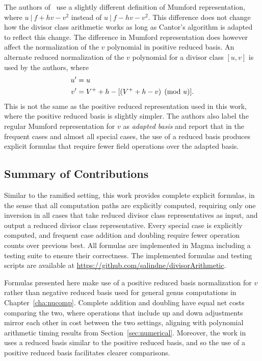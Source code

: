 The authors of~\cite{EricksonJacobsonStein_realg2_2011} use a slightly different
definition of Mumford representation, where $u ~|~ f + hv - v^2$ instead of $u
~|~ f - hv - v^2$. This difference does not change how the divisor class
arithmetic works as long as Cantor's algorithm is adapted to reflect this
change. The difference in Mumford representation does however affect the
normalization of the $v$ polynomial in positive reduced basis. An alternate reduced
normalization of the $v$ polynomial for a divisor class $[u,v]$ is used by the
authors, where 
\begin{align}
  u' & =  u \nonumber\\
  v' & =  V^{+} + h - [(V^{+} + h - v) \pmod{u}]. \label{eqn:reducedbasis}
\end{align}
This is not the same as the positive reduced representation used in this work,
where the positive reduced basis is slightly simpler. The authors also label the
regular Mumford representation for $v$ as \emph{adapted basis} and report that
in the frequent cases and almost all special cases, the use of a reduced basis
produces explicit formulas that require fewer field operations over the adapted
basis.

 
\subsection{Summary of Contributions}
Similar to the ramified setting, this work provides complete explicit formulas,
in the sense that all computation paths are explicitly computed, requiring only
one inversion in all cases that take reduced divisor class representatives as
input, and output a reduced divisor class representative. Every special case is
explicitly computed, and frequent case addition and doubling require fewer
operation counts over previous best. 
All formulas are implemented in Magma
including a testing suite to ensure their correctness. The implemented formulas
and testing scripts are available at
\url{https://github.com/salindne/divisorArithmetic}.
 

Formulas presented here make use of a positive reduced basis normalization for
$v$ rather than negative reduced basis used for general genus computations in
Chapter~\ref{cha:nucomp}. Complete addition and doubling have equal net
costs comparing the two, where operations that include up and down adjustments
mirror each other in cost between the two settings, aligning with polynomial
arithmetic timing results from Section~\ref{sec:numerical}. Moreover, the work
in~\cite{EricksonJacobsonStein_realg2_2011} uses a reduced basis similar to the
positive reduced basis, and so the use of a positive reduced basis facilitates
clearer comparisons. 

